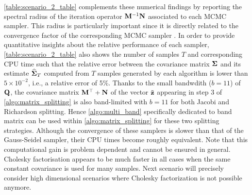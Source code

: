 \documentclass[nohypdvips,onefignum,onetabnum]{siamart171218}
\begin{document}
\cref{table:scenario_2_table} complements these numerical findings by reporting the spectral radius of the iteration operator $\mathbf{M}^{-1}\mathbf{N}$ associated to each MCMC sampler.
This radius is particularly important since it is directly related to the convergence factor of the corresponding MCMC sampler \cite{Fox2017}. 
In order to provide quantitative insights about the relative performance of each sampler, \cref{table:scenario_2_table} also shows the number of samples $T$ and corresponding CPU time such that the relative error between the covariance matrix $\mathbf{\Sigma}$ and its estimate $\mathbf{\widehat{\Sigma}}_T$ computed from $T$ samples generated by each algorithm is lower than $5 \times 10^{-2}$, i.e., a relative error of 5$\%$.
Thanks to the small bandwdith ($b=11$) of $\mathbf{Q}$, the covariance matrix $\mathbf{M}^{\top} + \mathbf{N}$ of the vector $\tilde{\mathbf{z}}$ appearing in step 3 of \cref{algo:matrix_splitting} is also band-limited with $b=11$ for both Jacobi and Richardson splitting.
Hence \cref{algo:multi_band} specifically dedicated to band matrix can be used within \cref{algo:matrix_splitting} for these two splitting strategies.
Although the convergence of these samplers is slower than that of the Gauss-Seidel sampler, their CPU times become roughly equivalent.
Note that this computational gain is problem dependent and cannot be ensured in general. Cholesky factorisation appears to be much faster in all cases when the same constant covariance is used for many samples. Next scenario will precisely consider high dimensional scenarios where Cholesky factorization is not possible anymore.
\end{document}
